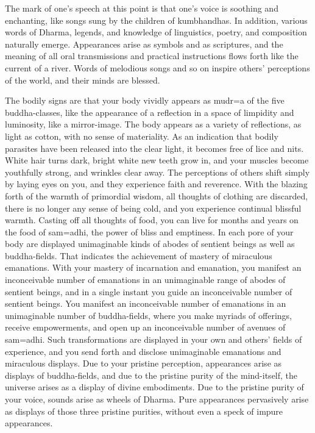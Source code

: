 \documentclass[11pt,twocolumn]{article}
\begin{document}
The mark of one's speech at this point is that one's voice is soothing
and enchanting, like songs sung by the children of kumbhandhas. In
addition, various words of Dharma, legends, and knowledge of
linguistics, poetry, and composition naturally emerge. Appearances
arise as symbols and as scriptures, and the meaning of all oral
transmissions and practical instructions flows forth like the current
of a river. Words of melodious songs and so on inspire others'
perceptions of the world, and their minds are blessed.

The bodily signs are that your body vividly appears as mudr\a={a} of
the five buddha\hyp{}classes, like the appearance of a reflection in a
space of limpidity and luminosity, like a mirror\hyp{}image. The body
appears as a variety of reflections, as light as cotton, with no sense
of materiality. As an indication that bodily parasites have been
released into the clear light, it becomes free of lice and nits. White
hair turns dark, bright white new teeth grow in, and your muscles
become youthfully strong, and wrinkles clear away. The perceptions of
others shift simply by laying eyes on you, and they experience faith
and reverence. With the blazing forth of the warmth of primordial
wisdom, all thoughts of clothing are discarded, there is no longer any
sense of being cold, and you experience continual blissful
warmth. Casting off all thoughts of food, you can live for months and
years on the food of sam\a={a}dhi, the power of bliss and
emptiness. In each pore of your body are displayed unimaginable kinds
of abodes of sentient beings as well as buddha\hyp{}fields. That
indicates the achievement of mastery of miraculous emanations. With
your mastery of incarnation and emanation, you manifest an
inconceivable number of emanations in an unimaginable range of abodes
of sentient beings, and in a single instant you guide an inconceivable
number of sentient beings. You manifest an inconceivable number of
emanations in an unimaginable number of buddha\hyp{}fields, where you
make myriads of offerings, receive empowerments, and open up an
inconceivable number of avenues of sam\a={a}dhi. Such transformations
are displayed in your own and others' fields of experience, and you
send forth and disclose unimaginable emanations and miraculous
displays. Due to your pristine perception, appearances arise as
displays of buddha\hyp{}fields, and due to the pristine purity of the
mind\hyp{}itself, the universe arises as a display of divine
embodiments. Due to the pristine purity of your voice, sounds arise as
wheels of Dharma. Pure appearances pervasively arise as displays of
those three pristine purities, without even a speck of impure
appearances.
\end{document}
